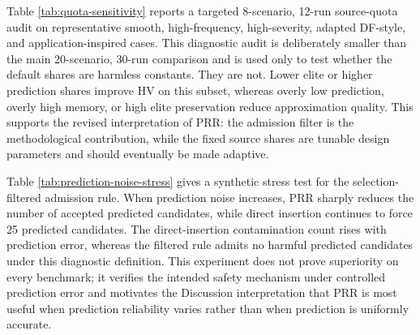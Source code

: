 \documentclass[1p,times]{elsarticle}
\begin{document}


Table \ref{tab:quota-sensitivity} reports a targeted 8-scenario, 12-run source-quota audit on representative smooth, high-frequency, high-severity, adapted DF-style, and application-inspired cases. This diagnostic audit is deliberately smaller than the main 20-scenario, 30-run comparison and is used only to test whether the default shares are harmless constants. They are not. Lower elite or higher prediction shares improve HV on this subset, whereas overly low prediction, overly high memory, or high elite preservation reduce approximation quality. This supports the revised interpretation of PRR: the admission filter is the methodological contribution, while the fixed source shares are tunable design parameters and should eventually be made adaptive.

Table \ref{tab:prediction-noise-stress} gives a synthetic stress test for the selection-filtered admission rule. When prediction noise increases, PRR sharply reduces the number of accepted predicted candidates, while direct insertion continues to force 25 predicted candidates. The direct-insertion contamination count rises with prediction error, whereas the filtered rule admits no harmful predicted candidates under this diagnostic definition. This experiment does not prove superiority on every benchmark; it verifies the intended safety mechanism under controlled prediction error and motivates the Discussion interpretation that PRR is most useful when prediction reliability varies rather than when prediction is uniformly accurate.


\end{document}
